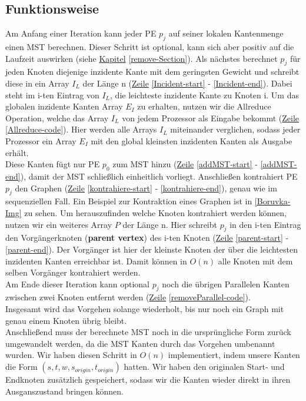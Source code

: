 \subsection{Funktionsweise}\label{Funktion-Borruvka}
Am Anfang einer Iteration kann jeder PE $p_j$ auf seiner lokalen Kantenmenge einen MST berechnen. Dieser Schritt ist optional, kann sich aber positiv auf die Laufzeit auswirken (siehe \hyperref[remove-Section]{Kapitel} \ref{remove-Section}).
Als nächstes berechnet $p_j$ für jeden Knoten diejenige inzidente Kante mit dem geringsten Gewicht und schreibt diese in ein Array $I_L$ der Länge n (\hyperref[Incident-start]{Zeile} \ref{Incident-start} - \ref{Incident-end}). Dabei steht im i-ten Eintrag von $I_L$, die leichteste inzidente Kante zu Knoten i. Um das globalen inzidente Kanten Array $E_I$ zu erhalten, nutzen wir die Allreduce Operation, welche das Array $I_L$ von jedem Prozessor als Eingabe bekommt (\hyperref[Allreduce-code]{Zeile} \ref{Allreduce-code}). Hier werden alle Arrays $I_L$ miteinander verglichen, sodass jeder Prozessor ein Array $E_I$ mit den global kleinsten inzidenten Kanten als Ausgabe erhält. \\
Diese Kanten fügt nur PE $p_0$ zum MST hinzu (\hyperref[addMST-start]{Zeile} \ref{addMST-start} - \ref{addMST-end}), damit der MST schließlich einheitlich vorliegt.
Anschließen kontrahiert PE $p_j$ den Graphen (\hyperref[kontrahiere-start]{Zeile} \ref{kontrahiere-start} - \ref{kontrahiere-end}), genau wie im sequenziellen Fall. Ein Beispiel zur Kontraktion eines Graphen ist in \cref{Boruvka-Img} zu sehen.
Um herauszufinden welche Knoten kontrahiert werden können, nutzen wir ein weiteres Array $P$ der Länge n. Hier schreibt $p_j$ in den i-ten Eintrag den Vorgängerknoten (\textbf{parent vertex}) des i-ten Knoten (\hyperref[parent-start]{Zeile} \ref{parent-start} - \ref{parent-end}).
Der Vorgänger ist hier der kleinste Knoten der über die leichtesten inzidenten Kanten erreichbar ist. Damit können in $O(n)$ alle Knoten mit dem selben Vorgänger kontrahiert werden.\\
Am Ende dieser Iteration kann optional $p_j$ noch die übrigen Parallelen Kanten zwischen zwei Knoten entfernt werden (\hyperref[removeParallel-code]{Zeile} \ref{removeParallel-code}). \\
Insgesamt wird das Vorgehen solange wiederholt, bis nur noch ein Graph mit genau einem Knoten übrig bleibt.\\
Anschließend muss der berechnete MST noch in die ursprüngliche Form zurück umgewandelt werden, da die MST Kanten durch das Vorgehen umbenannt wurden.
Wir haben diesen Schritt in $O(n)$ implementiert, indem unsere Kanten die Form $(s,t,w,s_{origin},t_{origin})$ hatten. Wir haben den originalen Start- und Endknoten zusätzlich gespeichert, sodass wir die Kanten wieder direkt in ihren Ausganszustand bringen können.

